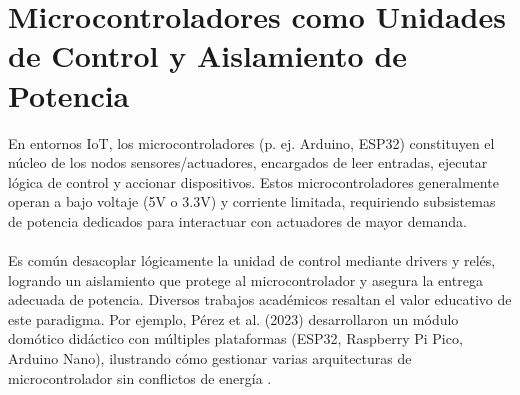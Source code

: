 \section{Microcontroladores como Unidades de Control y Aislamiento de Potencia}
En entornos IoT, los microcontroladores (p. ej. Arduino, ESP32) constituyen el núcleo de los nodos sensores/actuadores, encargados de leer entradas, ejecutar lógica de control y accionar dispositivos. Estos microcontroladores generalmente operan a bajo voltaje (5V o 3.3V) y corriente limitada, requiriendo subsistemas de potencia dedicados para interactuar con actuadores de mayor demanda.
\\\\
Es común desacoplar lógicamente la unidad de control mediante drivers y relés, logrando un aislamiento que protege al microcontrolador y asegura la entrega adecuada de potencia. Diversos trabajos académicos resaltan el valor educativo de este paradigma. Por ejemplo, Pérez et al. (2023) desarrollaron un módulo domótico didáctico con múltiples plataformas (ESP32, Raspberry Pi Pico, Arduino Nano), ilustrando cómo gestionar varias arquitecturas de microcontrolador sin conflictos de energía \cite{Perez2023}.
